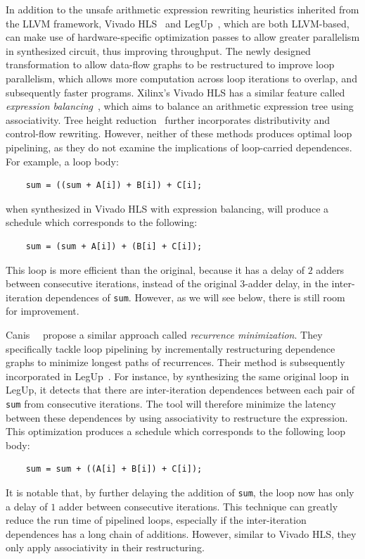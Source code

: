 In addition to the unsafe arithmetic expression rewriting heuristics inherited
from the LLVM framework, Vivado HLS~\cite{vivado_hls} and LegUp~\cite{legup},
which are both LLVM-based, can make use of hardware-specific optimization
passes to allow greater parallelism in synthesized circuit, thus improving
throughput.  The newly designed transformation to allow data-flow graphs to be
restructured to improve loop parallelism, which allows more computation across
loop iterations to overlap, and subsequently faster programs.  Xilinx's Vivado
HLS has a similar feature called \emph{expression balancing}~\cite{vivado_hls},
which aims to balance an arithmetic expression tree using associativity.  Tree
height reduction~\cite{nicolau91} further incorporates distributivity and
control-flow rewriting.  However, neither of these methods produces optimal
loop pipelining, as they do not examine the implications of loop-carried
dependences.  For example, a loop body:
\begin{lstlisting}
    sum = ((sum + A[i]) + B[i]) + C[i];
\end{lstlisting}\vspace{-15pt}
when synthesized in Vivado HLS with expression balancing, will produce a
schedule which corresponds to the following:
\begin{lstlisting}
    sum = (sum + A[i]) + (B[i] + C[i]);
\end{lstlisting}\vspace{-15pt}
This loop is more efficient than the original, because it has a delay of $2$
adders between consecutive iterations, instead of the original $3$-adder delay,
in the inter-iteration dependences of \verb|sum|.  However, as we will see
below, there is still room for improvement.

Canis~\etal~\cite{canis14} propose a similar approach called \emph{recurrence
minimization}.  They specifically tackle loop pipelining by incrementally
restructuring dependence graphs to minimize longest paths of recurrences.
Their method is subsequently incorporated in LegUp~\cite{legup}.  For instance,
by synthesizing the same original loop in LegUp, it detects that there are
inter-iteration dependences between each pair of \verb|sum| from consecutive
iterations.  The tool will therefore minimize the latency between these
dependences by using associativity to restructure the expression.  This
optimization produces a schedule which corresponds to the following loop body:
\begin{lstlisting}
    sum = sum + ((A[i] + B[i]) + C[i]);
\end{lstlisting}\vspace{-15pt}
It is notable that, by further delaying the addition of \verb|sum|, the loop
now has only a delay of $1$ adder between consecutive iterations.  This
technique can greatly reduce the run time of pipelined loops, especially if the
inter-iteration dependences has a long chain of additions.  However, similar to
Vivado HLS, they only apply associativity in their restructuring.


